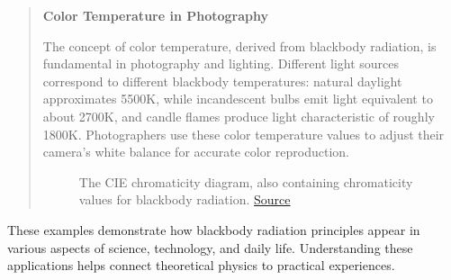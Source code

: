 \documentclass[
  a4paper,
]{book}
\begin{document}
\begin{tcolorbox}
\begin{quote}
\textbf{Color Temperature in Photography}

The concept of color temperature, derived from blackbody radiation, is
fundamental in photography and lighting. Different light sources
correspond to different blackbody temperatures: natural daylight
approximates 5500K, while incandescent bulbs emit light equivalent to
about 2700K, and candle flames produce light characteristic of roughly
1800K. Photographers use these color temperature values to adjust their
camera's white balance for accurate color reproduction.

\begin{figure}[H]


\caption{\label{fig-color-temperature}The CIE chromaticity diagram, also
containing chromaticity values for blackbody radiation.
\href{https://en.wikipedia.org/wiki/Chromaticity\#/media/File:PlanckianLocus.png}{Source}}

\end{figure}%
\end{quote}

These examples demonstrate how blackbody radiation principles appear in
various aspects of science, technology, and daily life. Understanding
these applications helps connect theoretical physics to practical
experiences.

\end{tcolorbox}
\end{document}

